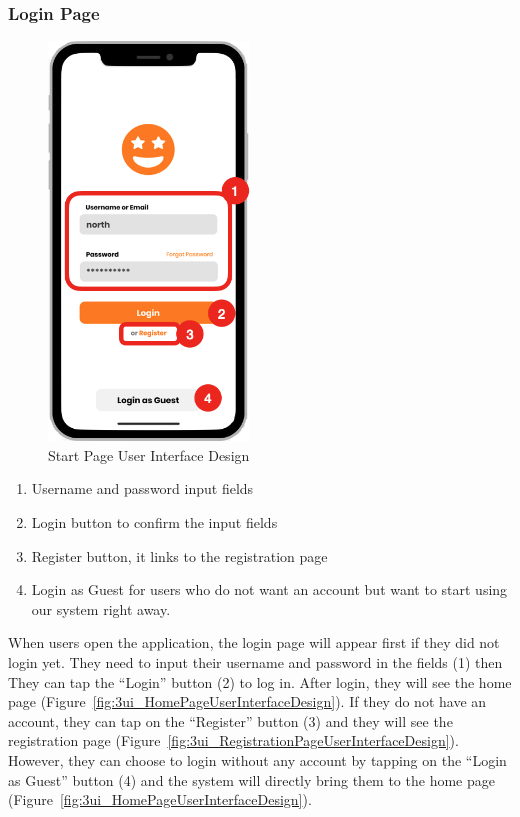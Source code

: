 \documentclass[12pt,oneside,openright,a4paper]{cpe-english-project}
\begin{document}
\subsubsection{Login Page}
\begin{figure}[H]\centering
\includegraphics[height=300pt]{./images/3ui_StartPageUserInterfaceDesign.png}
\caption{Start Page User Interface Design}\label{fig:3ui_StartPageUserInterfaceDesign}
\end{figure}\vspace{-24pt}

\begin{enumerate}
\item Username and password input fields
\item Login button to confirm the input fields
\item Register button, it links to the registration page
\item Login as Guest for users who do not want an account but want to start using our system right away.
\end{enumerate}

When users open the application, the login page will appear first if they did not login yet. They need to input their username and password in the fields (1) then They can tap the “Login” button (2) to log in. After login, they will see the home page (Figure~\ref{fig:3ui_HomePageUserInterfaceDesign}). If they do not have an account, they can tap on the “Register” button (3) and they will see the registration page (Figure~\ref{fig:3ui_RegistrationPageUserInterfaceDesign}). However, they can choose to login without any account by tapping on the “Login as Guest” button (4) and the system will directly bring them to the home page (Figure~\ref{fig:3ui_HomePageUserInterfaceDesign}).
\end{document}
